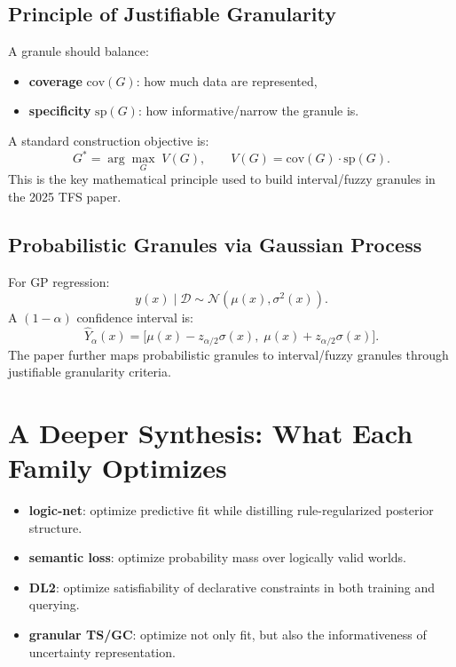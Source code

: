 ﻿\documentclass[11pt,a4paper]{article}
\begin{document}
\subsection{Principle of Justifiable Granularity}
A granule should balance:
\begin{itemize}
\item \textbf{coverage} $\mathrm{cov}(G)$: how much data are represented,
\item \textbf{specificity} $\mathrm{sp}(G)$: how informative/narrow the granule is.
\end{itemize}
A standard construction objective is:
\begin{equation}
G^{\ast}=\arg\max_{G}\;V(G),
\qquad
V(G)=\mathrm{cov}(G)\cdot \mathrm{sp}(G).
\label{eq:jg}
\end{equation}
This is the key mathematical principle used to build interval/fuzzy granules in the 2025 TFS paper.

\subsection{Probabilistic Granules via Gaussian Process}
For GP regression:
\begin{equation}
y(x)\mid \mathcal{D} \sim \mathcal{N}(\mu(x),\sigma^2(x)).
\label{eq:gp_pred}
\end{equation}
A $(1-\alpha)$ confidence interval is:
\begin{equation}
\hat Y_{\alpha}(x)=\big[\mu(x)-z_{\alpha/2}\sigma(x),\;\mu(x)+z_{\alpha/2}\sigma(x)\big].
\label{eq:gp_ci}
\end{equation}
The paper further maps probabilistic granules to interval/fuzzy granules through justifiable granularity criteria.

\section{A Deeper Synthesis: What Each Family Optimizes}
\begin{itemize}
\item \textbf{logic-net}: optimize predictive fit while distilling rule-regularized posterior structure.
\item \textbf{semantic loss}: optimize probability mass over logically valid worlds.
\item \textbf{DL2}: optimize satisfiability of declarative constraints in both training and querying.
\item \textbf{granular TS/GC}: optimize not only fit, but also the informativeness of uncertainty representation.
\end{itemize}
\end{document}

